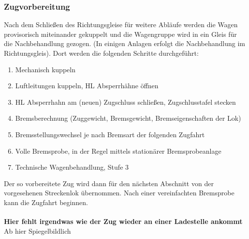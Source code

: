 \subsubsection{Zugvorbereitung}
Nach dem Schließen des Richtungsgleise für weitere Abläufe werden die Wagen provisorisch miteinander gekuppelt und die Wagengruppe wird in ein Gleis für die Nachbehandlung gezogen. (In einigen Anlagen erfolgt die Nachbehandlung im Richtungsgleis). Dort werden die folgenden Schritte durchgeführt:
\begin{enumerate}
    \item Mechanisch kuppeln
    \item Luftleitungen kuppeln, HL Absperrhähne öffnen
    \item HL Absperrhahn am (neuen) Zugschluss schließen, Zugschlusstafel stecken
    \item Bremsberechnung (Zuggewicht, Bremsgewicht, Bremseigenschaften der Lok)
    \item Bremsstellungswechsel je nach Bremsart der folgenden Zugfahrt
    \item Volle Bremsprobe, in der Regel mittels stationärer Bremsprobeanlage
    \item Technische Wagenbehandlung, Stufe 3
\end{enumerate}
Der so vorbereitete Zug wird dann für den nächsten Abschnitt von der vorgesehenen Streckenlok übernommen. Nach einer vereinfachten Bremsprobe kann die Zugfahrt beginnen.\\\\
\textbf{Hier fehlt irgendwas wie der Zug wieder an einer Ladestelle ankommt}\\
Ab hier Spiegelbildlich
